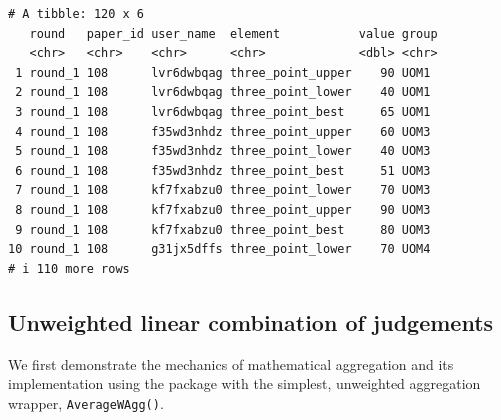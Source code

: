 \documentclass[
  11pt,
  a4paper,
]{article}
\begin{document}
\begin{verbatim}
# A tibble: 120 x 6
   round   paper_id user_name  element           value group
   <chr>   <chr>    <chr>      <chr>             <dbl> <chr>
 1 round_1 108      lvr6dwbqag three_point_upper    90 UOM1 
 2 round_1 108      lvr6dwbqag three_point_lower    40 UOM1 
 3 round_1 108      lvr6dwbqag three_point_best     65 UOM1 
 4 round_1 108      f35wd3nhdz three_point_upper    60 UOM3 
 5 round_1 108      f35wd3nhdz three_point_lower    40 UOM3 
 6 round_1 108      f35wd3nhdz three_point_best     51 UOM3 
 7 round_1 108      kf7fxabzu0 three_point_lower    70 UOM3 
 8 round_1 108      kf7fxabzu0 three_point_upper    90 UOM3 
 9 round_1 108      kf7fxabzu0 three_point_best     80 UOM3 
10 round_1 108      g31jx5dffs three_point_lower    70 UOM4 
# i 110 more rows
\end{verbatim}

\begin{table}[H]

\caption{\label{tbl-focal-claim}Example of expert judgement data for a
single claim.}


\end{table}%

\subsection{Unweighted linear combination of
judgements}\label{sec-AverageWAgg}

We first demonstrate the mechanics of mathematical aggregation and its
implementation using the  package with the simplest,
unweighted aggregation wrapper, \texttt{AverageWAgg()}.
\end{document}
